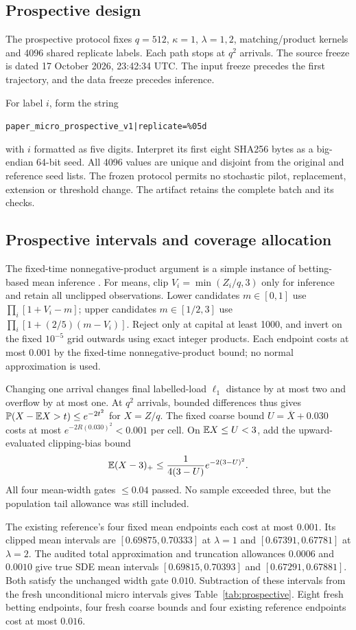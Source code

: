 \subsection{Prospective design}
The prospective protocol fixes $q=512$, $\kappa=1$, $\lambda=1,2$, matching/product kernels and 4096 shared replicate labels. Each path stops at $q^2$ arrivals. The source freeze is dated 17 October 2026, 23:42:34 UTC. The input freeze precedes the first trajectory, and the data freeze precedes inference.

For label $i$, form the string
\begin{center}\small\texttt{paper\_micro\_prospective\_v1|replicate=\%05d}\end{center}
with $i$ formatted as five digits. Interpret its first eight SHA256 bytes as a big-endian 64-bit seed. All 4096 values are unique and disjoint from the original and reference seed lists. The frozen protocol permits no stochastic pilot, replacement, extension or threshold change. The artifact retains the complete batch and its checks.

\subsection{Prospective intervals and coverage allocation}
The fixed-time nonnegative-product argument is a simple instance of betting-based mean inference \cite{betting}. For means, clip $V_i=\min(Z_i/q,3)$ only for inference and retain all unclipped observations. Lower candidates $m\in[0,1]$ use $\prod_i[1+V_i-m]$; upper candidates $m\in[1/2,3]$ use $\prod_i[1+(2/5)(m-V_i)]$. Reject only at capital at least 1000, and invert on the fixed $10^{-5}$ grid outwards using exact integer products. Each endpoint costs at most $0.001$ by the fixed-time nonnegative-product bound; no normal approximation is used.

Changing one arrival changes final labelled-load $\ell_1$ distance by at most two and overflow by at most one. At $q^2$ arrivals, bounded differences thus gives $\mathbb P(X-\mathbb E X>t)\le e^{-2t^2}$ for $X=Z/q$. The fixed coarse bound $U=\overline X+0.030$ costs at most $e^{-2R(0.030)^2}<0.001$ per cell. On $\mathbb E X\le U<3$, add the upward-evaluated clipping-bias bound
\[
 \mathbb E(X-3)_+\le\frac{1}{4(3-U)}e^{-2(3-U)^2}.
\]
All four mean-width gates $\le0.04$ passed. No sample exceeded three, but the population tail allowance was still included.

The existing reference's four fixed mean endpoints each cost at most $0.001$. Its clipped mean intervals are $[0.69875,0.70333]$ at $\lambda=1$ and $[0.67391,0.67781]$ at $\lambda=2$. The audited total approximation and truncation allowances $0.0006$ and $0.0010$ give true SDE mean intervals $[0.69815,0.70393]$ and $[0.67291,0.67881]$. Both satisfy the unchanged width gate $0.010$. Subtraction of these intervals from the fresh unconditional micro intervals gives Table~\ref*{tab:prospective}. Eight fresh betting endpoints, four fresh coarse bounds and four existing reference endpoints cost at most $0.016$.

